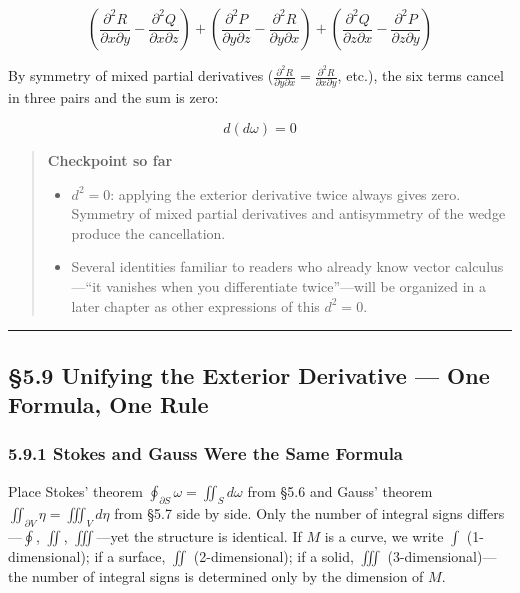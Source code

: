 \[\left(\frac{\partial^2 R}{\partial x \partial y} - \frac{\partial^2 Q}{\partial x \partial z}\right) + \left(\frac{\partial^2 P}{\partial y \partial z} - \frac{\partial^2 R}{\partial y \partial x}\right) + \left(\frac{\partial^2 Q}{\partial z \partial x} - \frac{\partial^2 P}{\partial z \partial y}\right)\]

By symmetry of mixed partial derivatives
(\(\frac{\partial^2 R}{\partial y \partial x}=\frac{\partial^2 R}{\partial x \partial y}\),
etc.), the six terms cancel in three pairs and the sum is zero:

\[d(d\omega) = 0\]

\begin{quote}
\textbf{Checkpoint so far}

\begin{itemize}
\item
  \(d^2 = 0\): applying the exterior derivative twice always gives zero.
  Symmetry of mixed partial derivatives and antisymmetry of the wedge
  produce the cancellation.
\item
  Several identities familiar to readers who already know vector
  calculus---``it vanishes when you differentiate twice''---will be
  organized in a later chapter as other expressions of this \(d^2=0\).
\end{itemize}
\end{quote}

\begin{center}\rule{0.5\linewidth}{0.5pt}\end{center}

\hypertarget{unifying-the-exterior-derivative-one-formula-one-rule}{%
\subsection{§5.9 Unifying the Exterior Derivative --- One Formula, One
Rule}\label{unifying-the-exterior-derivative-one-formula-one-rule}}

\hypertarget{stokes-and-gauss-were-the-same-formula}{%
\subsubsection{5.9.1 Stokes and Gauss Were the Same
Formula}\label{stokes-and-gauss-were-the-same-formula}}

Place Stokes' theorem \(\oint_{\partial S}\omega = \iint_S d\omega\)
from §5.6 and Gauss' theorem \(\iint_{\partial V}\eta = \iiint_V d\eta\)
from §5.7 side by side. Only the number of integral signs
differs---\(\oint\), \(\iint\), \(\iiint\)---yet the structure is
identical. If \(M\) is a curve, we write \(\int\) (1-dimensional); if a
surface, \(\iint\) (2-dimensional); if a solid, \(\iiint\)
(3-dimensional)---the number of integral signs is determined only by the
dimension of \(M\).

